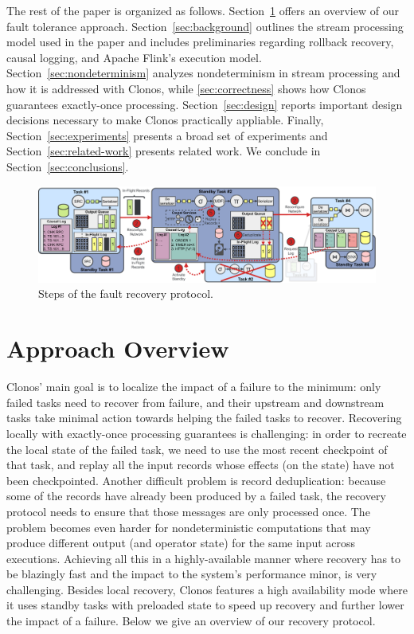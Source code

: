 \documentclass[sigconf]{acmart}
\begin{document}
The rest of the paper is organized as follows.
Section~\ref{sec:overview} offers an  overview of our fault tolerance approach.
Section~\ref{sec:background} outlines the stream processing model used in the paper and includes preliminaries regarding rollback recovery, causal logging, and Apache Flink's execution model.
Section~\ref{sec:nondeterminism} analyzes nondeterminism in stream processing and how it is addressed with Clonos, while \autoref{sec:correctness} shows how Clonos guarantees exactly-once processing.
Section~\ref{sec:design} reports important design decisions necessary to make Clonos practically appliable.
Finally, Section~\ref{sec:experiments} presents a broad set of experiments and Section~\ref{sec:related-work} 
presents related work. We conclude in Section~\ref{sec:conclusions}.


\begin{figure}[!t]
\centering
\includegraphics[width=.95\textwidth]{Figures/recovery.pdf}
\vspace{-2mm}
\caption{Steps of the fault recovery protocol.}
\label{fig:recovery-protocol}
\end{figure}


\section{Approach Overview}
\label{sec:overview}
Clonos' main goal is to localize the impact of a failure to the minimum: only failed tasks need to recover from failure, and their upstream and downstream tasks take minimal action towards helping the failed tasks to recover.  %
Recovering locally with exactly-once processing guarantees is challenging: in order to recreate the local state of the failed task, we need to use the most recent checkpoint of that task, and replay all the input records whose effects (on the state) have not been checkpointed. 
Another difficult problem is record deduplication: because some of the records have already been produced by a failed task, the recovery protocol needs to ensure that those messages are only processed once.
The problem becomes even harder for nondeterministic computations that may produce different output (and operator state) for the same input across executions. Achieving all this in a highly-available manner where recovery has to be blazingly fast and the impact to the system's performance minor, is very challenging.
Besides local recovery, Clonos features a high availability mode where it uses standby tasks with preloaded state to speed up recovery and further lower the impact of a failure.
Below we give an overview of our recovery protocol.
\end{document}
